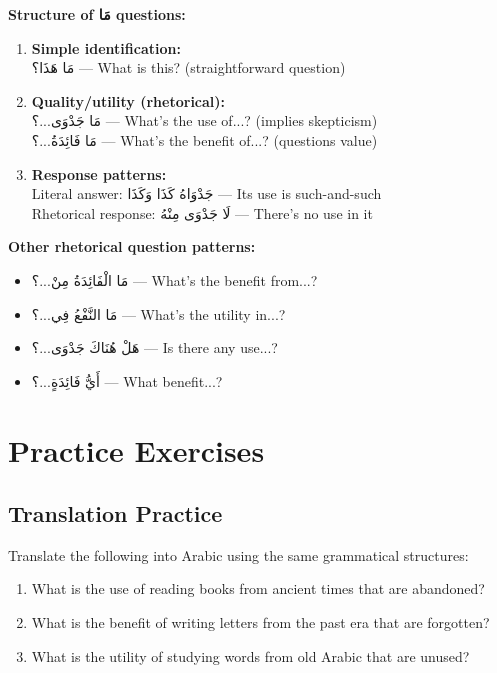 \documentclass[letterpaper,12pt]{article}
\begin{document}
\begin{tcolorbox}[colback=boxcolor,colframe=headercolor,breakable]
\textbf{Structure of \textarabic{مَا} questions:}

\begin{enumerate}
\item \textbf{Simple identification:}\\
\textarabic{مَا هَذَا؟} — What is this? (straightforward question)

\item \textbf{Quality/utility (rhetorical):}\\
\textarabic{مَا جَدْوَى...؟} — What's the use of...? (implies skepticism)\\
\textarabic{مَا فَائِدَةُ...؟} — What's the benefit of...? (questions value)

\item \textbf{Response patterns:}\\
Literal answer: \textarabic{جَدْوَاهُ كَذَا وَكَذَا} — Its use is such-and-such\\
Rhetorical response: \textarabic{لَا جَدْوَى مِنْهُ} — There's no use in it
\end{enumerate}

\textbf{Other rhetorical question patterns:}
\begin{itemize}
\item \textarabic{مَا الْفَائِدَةُ مِنْ...؟} — What's the benefit from...?
\item \textarabic{مَا النَّفْعُ فِي...؟} — What's the utility in...?
\item \textarabic{هَلْ هُنَاكَ جَدْوَى...؟} — Is there any use...?
\item \textarabic{أَيُّ فَائِدَةٍ...؟} — What benefit...?
\end{itemize}
\end{tcolorbox}

\section{Practice Exercises}

\subsection{Translation Practice}

Translate the following into Arabic using the same grammatical structures:

\begin{enumerate}
\item What is the use of reading books from ancient times that are abandoned?
\vspace{2em}

\item What is the benefit of writing letters from the past era that are forgotten?
\vspace{2em}

\item What is the utility of studying words from old Arabic that are unused?
\vspace{2em}
\end{enumerate}
\end{document}

